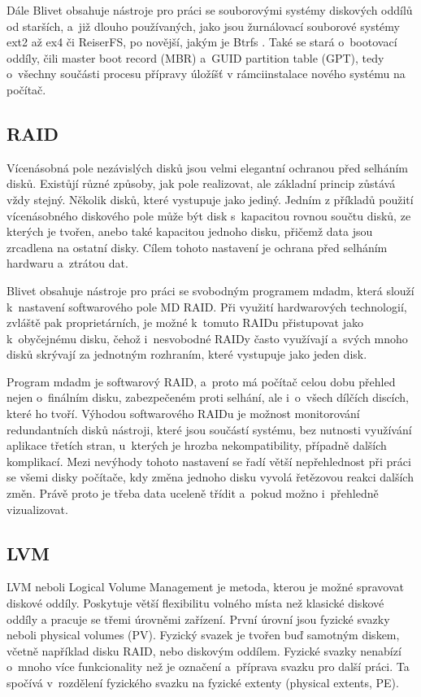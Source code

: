 \documentclass[color,table,oneside,nolot,nolof]{fithesis}
\begin{document}
	Dále Blivet obsahuje nástroje pro práci se souborovými systémy diskových oddílů od starších, a~již dlouho používaných, jako jsou žurnálovací souborové systémy ext2 až ex4 či ReiserFS, po novější,
	jakým je Btrfs . Také se stará o~bootovací oddíly, čili master boot record (MBR) a~GUID partition table (GPT), tedy o~všechny součásti procesu přípravy 
	úložíšť v rámciinstalace
	nového systému na počítač.

\subsection{RAID}
	Vícenásobná pole nezávislých disků jsou velmi elegantní ochranou před selháním disků. Existůjí různé způsoby, jak pole realizovat, ale základní princip zůstává vždy stejný. 
	Několik disků, které vystupuje jako jediný. Jedním z příkladů použití vícenásobného diskového pole může být disk s~kapacitou rovnou součtu disků, ze kterých je tvořen, anebo také
	kapacitou jednoho disku, přičemž data jsou zrcadlena na ostatní disky. Cílem tohoto nastavení je ochrana před selháním hardwaru a~ztrátou dat. 
	
	Blivet obsahuje nástroje pro práci se svobodným programem mdadm, která slouží k~nastavení softwarového pole MD RAID. Při využití hardwarových technologií, zvláště pak proprietárních,
	je možné k~tomuto RAIDu přistupovat jako k~obyčejnému disku, čehož i~nesvobodné RAIDy často využívají a~svých mnoho disků skrývají za jednotným rozhraním, které vystupuje jako jeden
	disk. 

	Program mdadm je softwarový RAID, a~proto má počítač celou dobu přehled nejen o~finálním disku, zabezpečeném proti selhání, ale i~o~všech dílčích discích, které ho tvoří. Výhodou
	softwarového RAIDu je
	možnost monitorování redundantních disků nástroji, které jsou součástí systému, bez nutnosti využívání aplikace třetích stran, u~kterých je hrozba nekompatibility, případně dalších 
	komplikací.
	Mezi nevýhody tohoto nastavení se řadí větší nepřehlednost při práci se všemi disky počítače, kdy změna jednoho disku vyvolá řetězovou reakci dalších změn. Právě proto je třeba data uceleně třídit
	a~pokud možno i~přehledně vizualizovat.

\subsection{LVM}
  LVM neboli Logical Volume Management je metoda, kterou je možné spravovat diskové oddíly. Poskytuje větší flexibilitu volného místa než klasické diskové oddíly a pracuje se třemi
	úrovněmi
	zařízení. První úrovní jsou fyzické svazky neboli physical volumes (PV). Fyzický svazek je tvořen buď samotným diskem, včetně například disku RAID, nebo diskovým oddílem. 
	Fyzické
	svazky nenabízí o~mnoho více funkcionality než je označení a~příprava svazku pro další práci. Ta spočívá v~rozdělení fyzického svazku na fyzické extenty (physical extents, PE).
\end{document}
